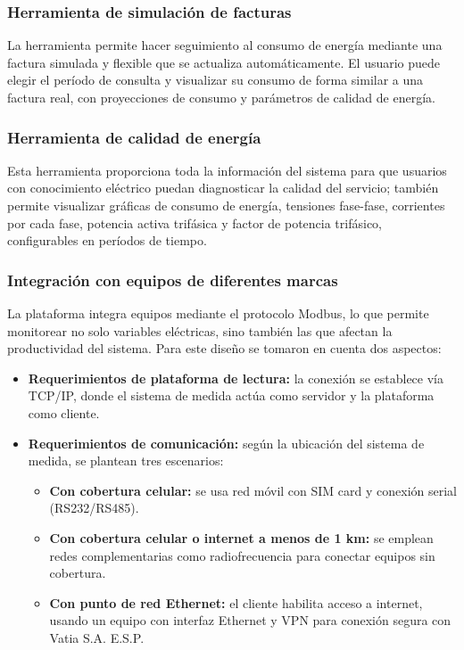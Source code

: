 \subsubsection{Herramienta de simulación de facturas}
La herramienta permite hacer seguimiento al consumo de energía mediante una factura simulada y flexible que se actualiza automáticamente. El usuario puede elegir el período de consulta y visualizar su consumo de forma similar a una factura real, con proyecciones de consumo y parámetros de calidad de energía.

\subsubsection{Herramienta de calidad de energía}
Esta herramienta proporciona toda la información del sistema para que usuarios con conocimiento eléctrico puedan diagnosticar la calidad del servicio; también permite visualizar gráficas de consumo de energía, tensiones fase-fase, corrientes por cada fase, potencia activa trifásica y factor de potencia trifásico, configurables en períodos de tiempo.

\subsubsection{Integración con equipos de diferentes marcas}
La plataforma integra equipos mediante el protocolo Modbus, lo que permite monitorear no solo variables eléctricas, sino también las que afectan la productividad del sistema. Para este diseño se tomaron en cuenta dos aspectos:
\begin{itemize}
    \item \textbf{Requerimientos de plataforma de lectura:} la conexión se establece vía TCP/IP, donde el sistema de medida actúa como servidor y la plataforma como cliente.
    \item \textbf{Requerimientos de comunicación:} según la ubicación del sistema de medida, se plantean tres escenarios:
    \begin{itemize}
        \item \textbf{Con cobertura celular:} se usa red móvil con SIM card y conexión serial (RS232/RS485).
        \item \textbf{Con cobertura celular o internet a menos de 1 km:} se emplean redes complementarias como radiofrecuencia para conectar equipos sin cobertura.
        \item \textbf{Con punto de red Ethernet:} el cliente habilita acceso a internet, usando un equipo con interfaz Ethernet y VPN para conexión segura con Vatia S.A. E.S.P.
    \end{itemize}
\end{itemize}


